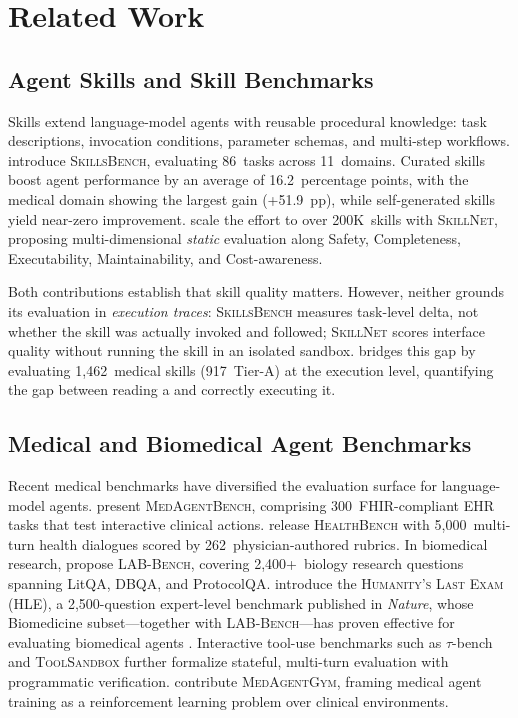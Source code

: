 \section{Related Work}
\label{sec:related_work}

\subsection{Agent Skills and Skill Benchmarks}
\label{sec:rw_skills}

Skills extend language-model agents with reusable procedural knowledge: task descriptions, invocation conditions, parameter schemas, and multi-step workflows.
\citet{skillsbench2026} introduce \textsc{SkillsBench}, evaluating 86~tasks across 11~domains.
Curated skills boost agent performance by an average of 16.2~percentage points, with the medical domain showing the largest gain (+51.9~pp), while self-generated skills yield near-zero improvement.
\citet{skillnet2026} scale the effort to over 200K~skills with \textsc{SkillNet}, proposing multi-dimensional \emph{static} evaluation along Safety, Completeness, Executability, Maintainability, and Cost-awareness.

Both contributions establish that skill quality matters.
However, neither grounds its evaluation in \emph{execution traces}: \textsc{SkillsBench} measures task-level delta, not whether the skill was actually invoked and followed; \textsc{SkillNet} scores interface quality without running the skill in an isolated sandbox.
\medskille bridges this gap by evaluating 1,462~medical skills (917~Tier-A) at the execution level, quantifying the \rbu gap between reading a \skillmd and correctly executing it.

\subsection{Medical and Biomedical Agent Benchmarks}
\label{sec:rw_medical_bench}

Recent medical benchmarks have diversified the evaluation surface for language-model agents.
\citet{medagentbench2025} present \textsc{MedAgentBench}, comprising 300~FHIR-compliant EHR tasks that test interactive clinical actions.
\citet{healthbench2025} release \textsc{HealthBench} with 5,000~multi-turn health dialogues scored by 262~physician-authored rubrics.
In biomedical research, \citet{labbench2024} propose \textsc{LAB-Bench}, covering 2,400+~biology research questions spanning LitQA, DBQA, and ProtocolQA.
\citet{hle2025} introduce the \textsc{Humanity's Last Exam} (HLE), a 2,500-question expert-level benchmark published in \emph{Nature}, whose Biomedicine subset---together with \textsc{LAB-Bench}---has proven effective for evaluating biomedical agents \citep{stella2025}.
Interactive tool-use benchmarks such as $\tau$-bench \citep{taubench2024} and \textsc{ToolSandbox} \citep{toolsandbox2024} further formalize stateful, multi-turn evaluation with programmatic verification.
\citet{medagentgym2025} contribute \textsc{MedAgentGym}, framing medical agent training as a reinforcement learning problem over clinical environments.

